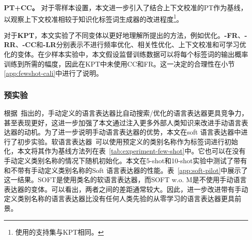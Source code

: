\textbf{PT+CC。} 对于零样本设置，本文进一步引入了结合上下文校准的PT作为基线，以观察上下文校准相较于知识化标签词生成器的改进程度\footnote{使用的支持集与KPT相同。}。

对于\textbf{KPT}，本文实验了不同变体以更好地理解所提出的方法，例如优化。\textbf{-FR}、\textbf{-RR}、\textbf{-CC}和\textbf{-LR}分别表示不进行频率优化、相关性优化、上下文校准和可学习优化的变体。在少样本实验中，本文假设监督训练数据可以将每个标签词的输出概率训练到所需的幅度，因此在KPT中未使用CC和FR。这一决定的合理性在小节\ref{app:fewshot-cali}中进行了说明。


\subsubsection{预实验}
\begin{table}[!htbp]
\caption{预实验证明了在语言表达器中融入人类专家知识的必要性}
\begin{center}
\end{center}
\label{app:soft-pilot}
\end{table}

根据~\citep{gao2020making}指出的，手动定义的语言表达器比自动搜索/优化的语言表达器更具竞争力，甚至表现更好，这进一步加强了本文通过注入更多外部人类知识来改进手动语言表达器的动机。为了进一步说明手动语言表达器的优势，本文在soft 语言表达器中进行了初步实验。软语言表达器~\cite{hambardzumyan-etal-2021-warp}可以使用预定义的类别名称作为标签词进行初始化，本文将其作为基线方法列在表~\ref{tab:experiment-few-shot}中。它也可以在没有手动定义类别名称的情况下随机初始化。本文在5-shot和10-shot实验中测试了带有和不带有手动定义类别名称的Soft 语言表达器的性能。表~\ref{app:soft-pilot}中展示了这一结果。SOFT是使用类名的软语言表达器，而SOFT w.o. M是不使用手动语言表达器的变体。可以看出，两者之间的差距通常较大。因此，进一步改进带有手动定义类别名称的语言表达器比没有任何人类先验的从零学习的语言表达器更具前景。



